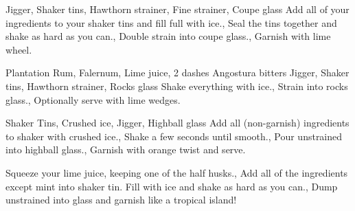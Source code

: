 \documentclass[../main.tex]{subfiles}
\begin{document}


%
{Jigger, Shaker tins, Hawthorn strainer, Fine strainer, Coupe glass}
%
{
	Add all of your ingredients to your shaker tins and fill full with ice.,
	Seal the tins together and shake as hard as you can.,
	Double strain into coupe glass.,
	{Garnish with lime wheel.}
}

\cocktailDivider

{
     Plantation Rum,
     Falernum,
     Lime juice,
    2 dashes Angostura bitters
}
{Jigger, Shaker tins, Hawthorn strainer, Rocks glass}
{
    Shake everything with ice.,
    Strain into rocks glass.,
    Optionally serve with lime wedges.
}

\cocktailDivider

{Shaker Tins, Crushed ice, Jigger, Highball glass}
{
    Add all (non-garnish) ingredients to shaker with crushed ice.,
    Shake a few seconds until smooth.,
    Pour unstrained into highball glass.,
    Garnish with orange twist and serve.
}

\cocktailDivider

{}
{
        {Squeeze your lime juice, keeping one of the half husks.},
        {Add all of the ingredients except mint into shaker tin. Fill with ice and shake as hard as you can.},
        {Dump unstrained into glass and garnish like a tropical island!}
}
\end{document}
